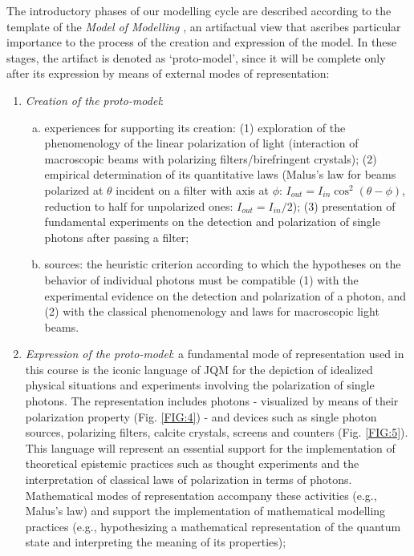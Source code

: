 \documentclass[twocolumn,secnumarabic,amssymb, nobibnotes, aps, prd, nofootinbib]{revtex4-2}
\begin{document}
The introductory phases of our modelling cycle are described according to the template of the \emph{Model of Modelling} \cite{Gilbert2002, Gilbert2016}, an artifactual view that ascribes particular importance to the process of the creation and expression of the model. In these stages, the artifact is denoted as `proto-model', since it will be complete only after its expression by means of external modes of representation:
\begin{enumerate}[1.]
    \item \textit{Creation of the proto-model}:
        \begin{enumerate}[(a)]
        \item experiences for supporting its creation: (1) exploration of the  phenomenology of the linear polarization of light (interaction of macroscopic beams with polarizing filters/birefringent crystals); (2) empirical determination of its quantitative laws (Malus's law for beams polarized at $\theta$ incident on a filter with axis at $\phi$: $I_{out}=I_{in}\cos^2{(\theta-\phi)}$, reduction to half for unpolarized ones: $I_{out}=I_{in}/2$); (3) presentation of fundamental experiments on the detection \cite{Grangier1986, Grangier2005} and polarization of single photons after passing a filter;
        \item sources: the heuristic criterion according to which the hypotheses on the behavior of individual photons must be compatible (1) with the experimental evidence on the detection and polarization of a photon, and (2) with the classical phenomenology and laws for macroscopic light beams.
        \end{enumerate}
    \item \textit{Expression of the proto-model}: a fundamental mode of representation used in this course is the iconic language of JQM for the depiction of idealized physical situations and experiments involving the polarization of single photons. The representation includes photons - visualized by means of their polarization property (Fig. \ref{FIG:4}) - and devices such as single photon sources, polarizing filters, calcite crystals, screens and counters (Fig. \ref{FIG:5}). This language will represent an essential support for the implementation of theoretical epistemic practices such as thought experiments and the interpretation of classical laws of polarization in terms of photons. Mathematical modes of representation accompany these activities (e.g., Malus's law) and support the implementation of mathematical modelling practices (e.g., hypothesizing a mathematical representation of the quantum state and interpreting the meaning of its properties);

\end{enumerate}
\end{document}
